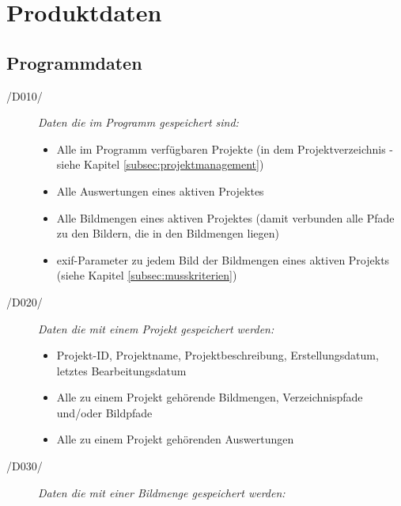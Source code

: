 \section{Produktdaten}

\subsection{Programmdaten}

\label{subsec:programmdaten}

\begin{description}
	
	\item[/D010/] \textit{Daten die im Programm gespeichert sind:}
	
	\begin{itemize} 
			
			\item Alle im Programm verfügbaren Projekte (in dem Projektverzeichnis - siehe Kapitel \ref{subsec:projektmanagement})
			
			\item Alle Auswertungen eines aktiven Projektes
			
			\item Alle Bildmengen eines aktiven Projektes (damit verbunden alle Pfade zu den Bildern, die in den Bildmengen liegen)
			
			\item \gls{exif}-Parameter zu jedem Bild der Bildmengen eines aktiven Projekts (siehe Kapitel \ref{subsec:musskriterien})
	
	\end{itemize}

	\item[/D020/] \textit{Daten die mit einem Projekt gespeichert werden:}
	
	\begin{itemize}
		
		\item Projekt-ID, Projektname, Projektbeschreibung, Erstellungsdatum, letztes Bearbeitungsdatum
		
		\item Alle zu einem Projekt gehörende Bildmengen, Verzeichnispfade und/oder Bildpfade
		
		\item Alle zu einem Projekt gehörenden Auswertungen
	
	\end{itemize}

	\item[/D030/] \textit{Daten die mit einer Bildmenge gespeichert werden:}
	

\end{description}
